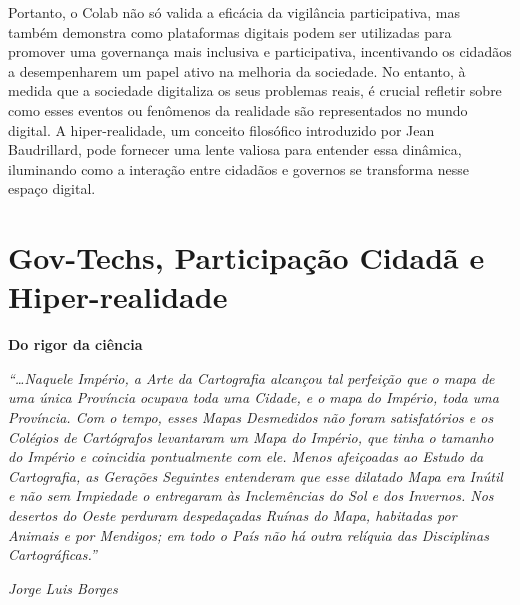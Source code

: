 Portanto, o Colab não só valida a eficácia da vigilância participativa, mas também demonstra como plataformas digitais podem ser utilizadas para promover uma governança mais inclusiva e participativa, incentivando os cidadãos a desempenharem um papel ativo na melhoria da sociedade. No entanto, à medida que a sociedade digitaliza os seus problemas reais, é crucial refletir sobre como esses eventos ou fenômenos da realidade são representados no mundo digital. A hiper-realidade, um conceito filosófico introduzido por Jean Baudrillard, pode fornecer uma lente valiosa para entender essa dinâmica, iluminando como a interação entre cidadãos e governos se transforma nesse espaço digital.

\section{Gov-Techs, Participação Cidadã e Hiper-realidade}

\begin{citacao}
	\small{
		\textbf{Do rigor da ciência}

		\textit{“…Naquele  Império,  a  Arte  da  Cartografia  alcançou  tal  perfeição  que  o  mapa  de  uma  única  Província  ocupava  toda  uma  Cidade,  e  o  mapa  do  Império,  toda  uma  Província. Com o tempo, esses Mapas Desmedidos não foram satisfatórios e os Colégios de Cartógrafos levantaram um Mapa do Império, que tinha o tamanho do Império e coincidia pontualmente com ele. Menos afeiçoadas ao Estudo da  Cartografia,  as  Gerações  Seguintes  entenderam  que  esse dilatado Mapa era Inútil e não sem Impiedade o entregaram às Inclemências do Sol e dos Invernos. Nos desertos do Oeste perduram despedaçadas Ruínas do Mapa, habitadas por Animais e por Mendigos; em todo o País não há  outra  relíquia  das  Disciplinas  Cartográficas.”}

		\textit{Jorge Luis Borges}
	}
\end{citacao}


